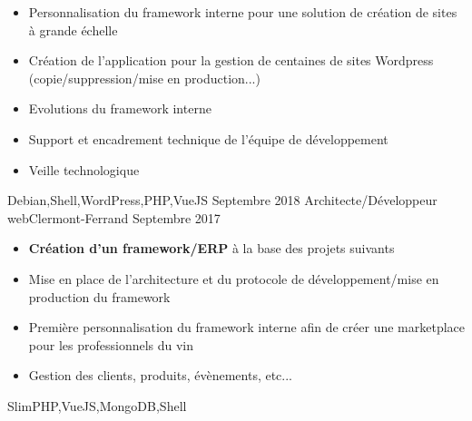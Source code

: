 \begin{experiences}
{\begin{itemize}
			\item Personnalisation du framework interne pour une solution de création de sites à grande échelle
			\item Création de l'application pour la gestion de centaines de sites Wordpress (copie/suppression/mise en production...)
			\item Evolutions du framework interne
                        \item Support et encadrement technique de l'équipe de développement                           
			\item Veille technologique
                      \end{itemize}
                    }
                    {Debian,Shell,WordPress,PHP,VueJS}
  \emptySeparator         
  \experience
  {Septembre 2018}  {Architecte/Développeur web}{}{Clermont-Ferrand}
  {Septembre 2017}   {
                      \begin{itemize}
			\item \textbf{Création d'un framework/ERP} à la base des projets suivants
			\item Mise en place de l'architecture et du protocole de développement/mise en production du framework
			\item Première personnalisation du framework interne afin de créer une marketplace pour les professionnels du vin
			\item Gestion des clients, produits, évènements, etc...
		      \end{itemize}
                  }
                  {SlimPHP,VueJS,MongoDB,Shell}  
\end{experiences}
